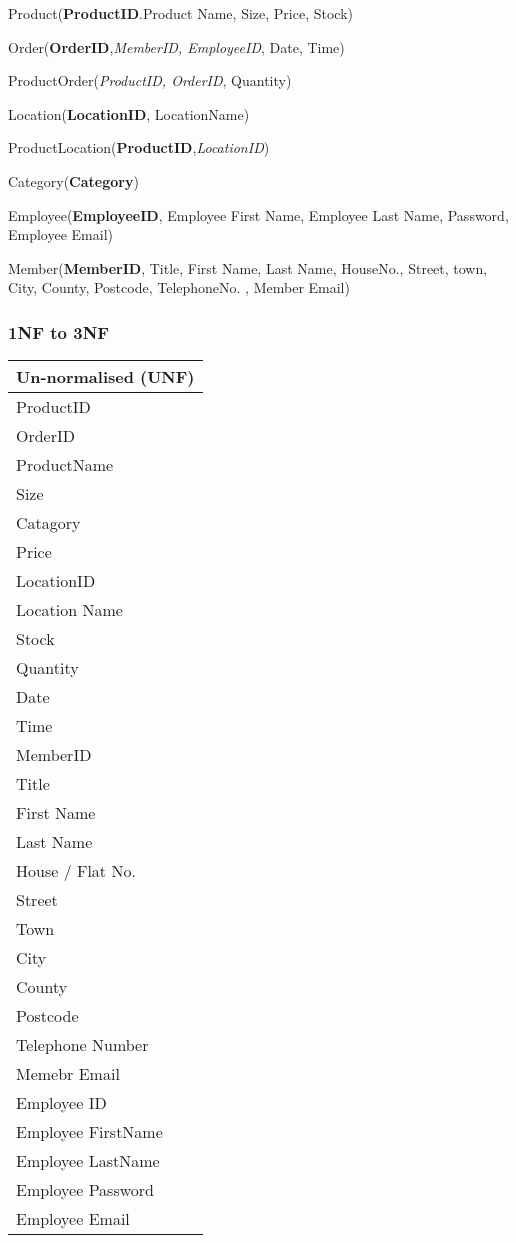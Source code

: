 Product(\textbf{ProductID}.Product Name, Size, Price, Stock)

Order(\textbf{OrderID},\textit{MemberID, EmployeeID}, Date, Time)

ProductOrder(\textit{ProductID, OrderID}, Quantity)

Location(\textbf{LocationID}, LocationName)

ProductLocation(\textbf{ProductID},\textit{LocationID})

Category(\textbf{Category})

Employee(\textbf{EmployeeID}, Employee First Name, Employee Last Name, Password, Employee Email)

Member(\textbf{MemberID}, Title, First Name, Last Name, HouseNo., Street, town, City, County, Postcode, TelephoneNo. , Member Email)

\pagebreak

\subsubsection{1NF to 3NF}



\begin{center}
    \begin{tabular}{|p{4cm}|}
        \hline
        \textbf{Un-normalised (UNF)}\\ \hline
	{ProductID}\\ \hline
	{OrderID}\\ \hline
	{ProductName}\\ \hline
	{Size}\\ \hline
	{Catagory}\\ \hline
	{Price}\\ \hline
	{LocationID}\\ \hline
	{Location Name}\\ \hline
	{Stock}\\ \hline
	{Quantity}\\ \hline
	{Date}\\ \hline
	{Time}\\ \hline
	{MemberID}\\ \hline
	{Title}\\ \hline
	{First Name}\\ \hline
	{Last Name}\\ \hline
	{House / Flat No.}\\ \hline
	{Street}\\ \hline
	{Town}\\ \hline
	{City}\\ \hline
	{County}\\ \hline
	{Postcode}\\ \hline
	{Telephone Number}\\ \hline
	{Memebr Email}\\ \hline
	{Employee ID}\\ \hline
	{Employee FirstName}\\ \hline
	{Employee LastName}\\ \hline
	{Employee Password}\\ \hline
	{Employee Email}\\ \hline
   \end{tabular}
\end{center}	
	
